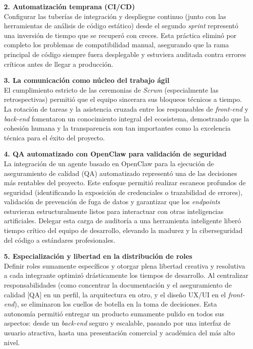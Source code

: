 \textbf{2. Automatización temprana (CI/CD)}\\
Configurar las tuberías de integración y despliegue continuo (junto con las herramientas de análisis de código estático) desde el segundo \textit{sprint} representó una inversión de tiempo que se recuperó con creces. Esta práctica eliminó por completo los problemas de compatibilidad manual, asegurando que la rama principal de código siempre fuera desplegable y estuviera auditada contra errores críticos antes de llegar a producción.

\newpage

\textbf{3. La comunicación como núcleo del trabajo ágil}\\
El cumplimiento estricto de las ceremonias de \textit{Scrum} (especialmente las retrospectivas) permitió que el equipo sincerara sus bloqueos técnicos a tiempo. La rotación de tareas y la asistencia cruzada entre los responsables de \textit{front-end} y \textit{back-end} fomentaron un conocimiento integral del ecosistema, demostrando que la cohesión humana y la transparencia son tan importantes como la excelencia técnica para el éxito del proyecto.

\textbf{4. QA automatizado con OpenClaw para validación de seguridad}\\
La integración de un agente basado en OpenClaw para la ejecución de aseguramiento de calidad (QA) automatizado representó una de las decisiones más rentables del proyecto. Este enfoque permitió realizar escaneos profundos de seguridad (identificando la exposición de credenciales o trazabilidad de errores), validación de prevención de fuga de datos y garantizar que los \textit{endpoints} estuvieran estructuralmente listos para interactuar con otras inteligencias artificiales. Delegar esta carga de auditoría a una herramienta inteligente liberó tiempo crítico del equipo de desarrollo, elevando la madurez y la ciberseguridad del código a estándares profesionales.

\textbf{5. Especialización y libertad en la distribución de roles}\\
Definir roles sumamente específicos y otorgar plena libertad creativa y resolutiva a cada integrante optimizó drásticamente los tiempos de desarrollo. Al centralizar responsabilidades (como concentrar la documentación y el aseguramiento de calidad [QA] en un perfil, la arquitectura en otro, y el diseño UX/UI en el \textit{front-end}), se eliminaron los cuellos de botella en la toma de decisiones. Esta autonomía permitió entregar un producto sumamente pulido en todos sus aspectos: desde un \textit{back-end} seguro y escalable, pasando por una interfaz de usuario atractiva, hasta una presentación comercial y académica del más alto nivel.
